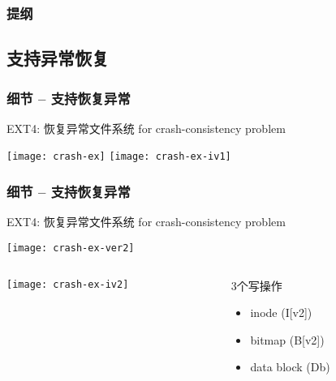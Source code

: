 \begin{frame}
\frametitle{提纲} %
\tableofcontents %
\end{frame}
\subsection{支持异常恢复}
\begin{frame}[fragile]
	\frametitle{细节 -- 支持恢复异常}
	EXT4: 恢复异常文件系统 for crash-consistency problem
	
	\centering
	\texttt{[image: crash-ex]}
	\texttt{[image: crash-ex-iv1]}
\end{frame}


\begin{frame}[fragile]
	\frametitle{细节 -- 支持恢复异常}
	EXT4: 恢复异常文件系统 for crash-consistency problem
	
	\centering
	\texttt{[image: crash-ex-ver2]}
	
	
		\begin{columns}
		\begin{column}{.5\textwidth}
			
		
			\centering
	\texttt{[image: crash-ex-iv2]}
			
		\end{column}
		\pause
		\begin{column}{.5\textwidth}			
		3个写操作
		\begin{itemize}
	\item inode (I[v2]) 
	\item bitmap (B[v2])
	\item data block (Db)
\end{itemize}
			
		\end{column}
	\end{columns}
	
\end{frame}



